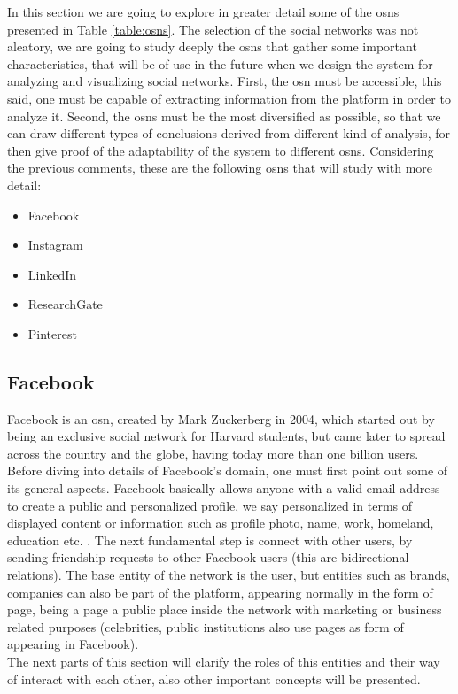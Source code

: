 In this section we are going to explore in greater detail some of the \glspl{osn} presented
in Table \ref{table:osns}. The selection of the social networks was not aleatory, we are going
to study deeply the \glspl{osn} that gather some important characteristics, that will be of use in
the future when we design the system for analyzing and visualizing social networks. First, the
\gls{osn} must be accessible, this said, one must be capable of extracting information from the platform
in order to analyze it. Second, the \glspl{osn} must be the most diversified as possible, so that we
can draw different types of conclusions derived from different kind of analysis, for then give proof
of the adaptability of the system to different \glspl{osn}. Considering the previous
comments, these are the following \glspl{osn} that will study with more detail:
\begin{itemize}
  \item Facebook
  \item Instagram
  \item LinkedIn
  \item ResearchGate
  \item Pinterest
\end{itemize}

\subsection{Facebook}

Facebook is an \gls{osn}, created by Mark Zuckerberg in 2004, which started out by being an exclusive social network for Harvard students, but came later to spread across
the country and the globe, having today more than one billion users.\\
\indent Before diving into details of Facebook's domain, one must first point out some of its general aspects. Facebook basically allows anyone with a valid email address to create a public and personalized profile,
we say personalized in terms of displayed content or information such as profile photo, name, work, homeland, education etc. .
The next fundamental step is connect with other users, by sending friendship requests to other Facebook users (this are bidirectional relations).
The base entity of the network is the user, but entities such as brands, companies can also be part of the platform, appearing normally
in the form of page, being a page a public place inside the network with marketing or business related purposes (celebrities, public institutions also use pages as form of appearing in Facebook).\\
\indent The next parts of this section will clarify the roles of this entities and their way of interact with each other, also other important concepts will be presented.

